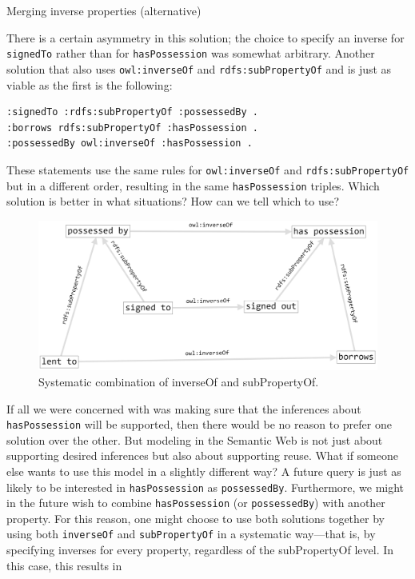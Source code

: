 \begin{challenge}{Merging inverse properties}
\solution (alternative)

There is a certain asymmetry in this solution; the choice to specify an
inverse for \texttt{signedTo} rather than for \texttt{hasPossession} was somewhat
arbitrary. Another solution that also uses \texttt{owl:inverseOf} and
\texttt{rdfs:subPropertyOf} and is just as viable as the first is the following:

\begin{lstlisting}
:signedTo :rdfs:subPropertyOf :possessedBy .
:borrows rdfs:subPropertyOf :hasPossession .
:possessedBy owl:inverseOf :hasPossession .
\end{lstlisting}

These statements use the same rules for \texttt{owl:inverseOf} and
\texttt{rdfs:subPropertyOf} but in a different order, resulting in the same
\texttt{hasPossession} triples. Which solution is better in what situations? How
can we tell which to use?



\begin{figure}
\centering
\includegraphics[width=5in]{SWWOv3/media/ch9/figure9-2.png}
\caption{Systematic combination of inverseOf and subPropertyOf.}
\label{fig:ch9.2}
\end{figure}


If all we were concerned with was making sure that the inferences about
\texttt{hasPossession} will be supported, then there would be no reason to prefer
one solution over the other. But modeling in the Semantic Web is not
just about supporting desired inferences but also about supporting
reuse. What if someone else
wants to use this model in a slightly different way? A future query is
just as likely to be interested in \texttt{hasPossession} as \texttt{possessedBy}.
Furthermore, we might in the future wish to combine \texttt{hasPossession} (or
\texttt{possessedBy}) with another property. For this reason, one might choose to
use both solutions together by using both \texttt{inverseOf} and \texttt{subPropertyOf} in
a systematic way---that is, by specifying inverses for every property,
regardless of the subPropertyOf level. In this case, this results in


\end{challenge}

